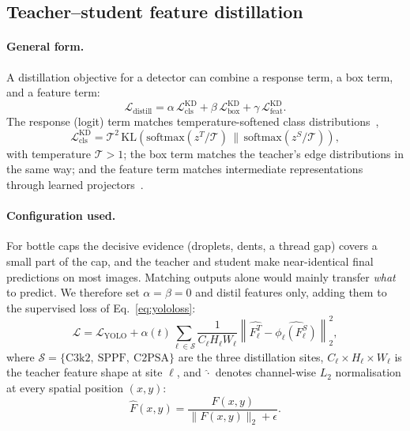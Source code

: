 \subsection{Teacher--student feature distillation}
\label{sec:kd-impl}

\paragraph{General form.} A distillation objective for a detector can combine a response term, a box term, and a feature term:
\begin{equation}
    \mathcal{L}_{\text{distill}} = \alpha\,\mathcal{L}^{\text{KD}}_{\text{cls}} + \beta\,\mathcal{L}^{\text{KD}}_{\text{box}} + \gamma\,\mathcal{L}^{\text{KD}}_{\text{feat}}.
    \label{eq:distill-general}
\end{equation}
The response (logit) term matches temperature-softened class distributions~\cite{hinton2015},
\begin{equation}
    \mathcal{L}^{\text{KD}}_{\text{cls}} = \mathcal{T}^2\,\mathrm{KL}\!\left(\mathrm{softmax}(z^T/\mathcal{T})\,\Big\|\,\mathrm{softmax}(z^S/\mathcal{T})\right),
    \label{eq:logitkd}
\end{equation}
with temperature $\mathcal{T}>1$; the box term matches the teacher's edge distributions in the same way; and the feature term matches intermediate representations through learned projectors~\cite{romero2015}.

\paragraph{Configuration used.} For bottle caps the decisive evidence (droplets, dents, a thread gap) covers a small part of the cap, and the teacher and student make near-identical final predictions on most images. Matching outputs alone would mainly transfer \emph{what} to predict. We therefore set $\alpha=\beta=0$ and distil features only, adding them to the supervised loss of Eq.~\eqref{eq:yololoss}:
\begin{equation}
    \mathcal{L} = \mathcal{L}_{\text{YOLO}} + \alpha(t)\sum_{\ell\in\mathcal{S}} \frac{1}{C_\ell H_\ell W_\ell}\left\| \widehat{F^T_\ell} - \widehat{\phi_\ell(F^S_\ell)} \right\|_2^2 ,
    \label{eq:kd}
\end{equation}
where $\mathcal{S}=\{\text{C3k2},\ \text{SPPF},\ \text{C2PSA}\}$ are the three distillation sites, $C_\ell\times H_\ell\times W_\ell$ is the teacher feature shape at site $\ell$, and $\widehat{\cdot}$ denotes channel-wise $L_2$ normalisation at every spatial position $(x,y)$:
\begin{equation}
    \widehat{F}(x,y) = \frac{F(x,y)}{\|F(x,y)\|_2+\epsilon}.
    \label{eq:l2norm}
\end{equation}

